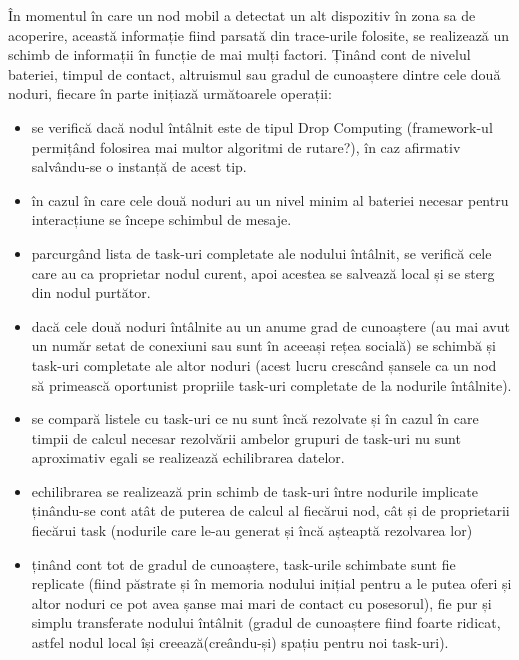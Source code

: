 \documentclass[12pt,a4paper]{report}
\begin{document}
În momentul în care un nod mobil a detectat un alt dispozitiv în zona sa de acoperire, această informație fiind parsată din trace-urile folosite, se realizează un schimb de informații în funcție de mai mulți factori. Ținând cont de nivelul bateriei, timpul de contact, altruismul sau gradul de cunoaștere dintre cele două noduri, fiecare în parte inițiază următoarele operații:
\begin{itemize}
	\item se verifică dacă nodul întâlnit este de tipul Drop Computing (framework-ul permițând folosirea mai multor algoritmi de rutare?), în caz afirmativ salvându-se o instanță de acest tip.
	\item în cazul în care cele două noduri au un nivel minim al bateriei necesar pentru interacțiune se începe schimbul de mesaje.
	\item parcurgând lista de task-uri completate ale nodului întâlnit, se verifică cele care au ca proprietar nodul curent, apoi acestea se salvează local și se sterg din nodul purtător.
	\item dacă cele două noduri întâlnite au un anume grad de cunoaștere (au mai avut un număr setat de conexiuni sau sunt în aceeași rețea socială) se schimbă și task-uri completate ale altor noduri (acest lucru crescând șansele ca un nod să primească oportunist propriile task-uri completate de la nodurile întâlnite).
	\item se compară listele cu task-uri ce nu sunt încă rezolvate și în cazul în care timpii de calcul necesar rezolvării ambelor grupuri de task-uri nu sunt aproximativ egali se realizează echilibrarea datelor.
	\item echilibrarea se realizează prin schimb de task-uri între nodurile implicate ținându-se cont atât de puterea de calcul al fiecărui nod, cât și de proprietarii fiecărui task (nodurile care le-au generat și încă așteaptă rezolvarea lor)
	\item ținând cont tot de gradul de cunoaștere, task-urile schimbate sunt fie replicate (fiind păstrate și în memoria nodului inițial pentru a le putea oferi și altor noduri ce pot avea șanse mai mari de contact cu posesorul), fie pur și simplu transferate nodului întâlnit (gradul de cunoaștere fiind foarte ridicat, astfel nodul local își creează(creându-și) spațiu pentru noi task-uri).
\end{itemize}
\end{document}
